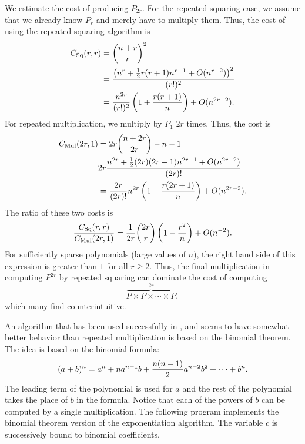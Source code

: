 We estimate the cost of producing $P_{2r}$.  For the repeated squaring
case, we assume that we already know $P_{r}$ and merely have to
multiply them.  Thus, the cost of using the repeated squaring
algorithm is
\[
\begin{aligned}
 C_{\rm Sq}(r,r) &= {n + r \choose r}^{2} \\
     & = \frac{\left(n^{r} + \frac{1}{2}r (r+1) n^{r-1}
                 + O(n^{r-2})\right)^{2}}{(r!)^{2}} \\
     & = \frac{n^{2r}}{(r!)^{2}}\left(1 + \frac{r(r+1)}{n}\right) 
                + O(n^{2r-2}).
\end{aligned}
\]
For repeated multiplication, we multiply by $P_{1}$ $2r$ times.  Thus, the
cost is
\[
\begin{aligned}
  C_{\rm Mul}(2r, 1) & = 2r{n+2r \choose 2r} - n-1 \\
     & 2r \frac{n^{2r} + \frac{1}{2}(2r)(2r+1) n^{2r-1} 
        + O(n^{2r-2})}{(2r)!} \\
     & = \frac{2r}{(2r)!}n^{2r}\left(1 + \frac{r(2r+1)}{n}\right) 
        + O(n^{2r-2}).
\end{aligned}
\]
The ratio of these two costs is 
\[
\frac{C_{\rm Sq}(r,r)}{C_{\rm Mul}(2r,1)} =
\frac{1}{2r}{2r \choose r} \left(1 - \frac{r^{2}}{n}\right) 
  + O(n^{-2}).
\]
For sufficiently sparse polynomials (large values of $n$), the right
hand side of this expression is greater than $1$ for all $r \ge 2$.
Thus, the final multiplication in computing $P^{2r}$ by repeated
squaring can dominate the cost of computing
\[
\overbrace{P \times P \times \cdots \times P}^{2r},
\]
which many find counterintuitive.

\medskip
An algorithm that has been used successfully in \Macsyma, and seems to have
somewhat better behavior than repeated multiplication is based on the
binomial theorem.  The idea is based on the binomial formula:
\[
(a + b)^n = a^n + n a^{n-1} b + {n (n - 1) \over 2} a^{n-2} b^2 +
\cdots + b^n.
\]
The leading term of the polynomial is used for $a$ and the rest of the
polynomial takes the place of $b$ in the formula.  Notice that each of the
powers of $b$ can be computed by a single multiplication.  The following
program implements the binomial theorem version of the exponentiation
algorithm.  The variable $c$ is successively bound to binomial
coefficients. 

